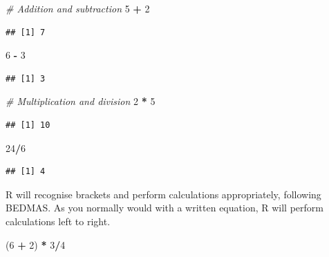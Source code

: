 \documentclass[
]{book}
\newenvironment{Shaded}{\begin{snugshade}}{\end{snugshade}}
\newcommand{\CommentTok}[1]{\textcolor[rgb]{0.56,0.35,0.01}{\textit{#1}}}
\newcommand{\DecValTok}[1]{\textcolor[rgb]{0.00,0.00,0.81}{#1}}
\newcommand{\NormalTok}[1]{#1}
\newcommand{\SpecialCharTok}[1]{\textcolor[rgb]{0.81,0.36,0.00}{\textbf{#1}}}
\begin{document}
\begin{Shaded}
\begin{Highlighting}[]
\CommentTok{\# Addition and subtraction}
\DecValTok{5} \SpecialCharTok{+} \DecValTok{2}
\end{Highlighting}
\end{Shaded}

\begin{verbatim}
## [1] 7
\end{verbatim}

\begin{Shaded}
\begin{Highlighting}[]
\DecValTok{6} \SpecialCharTok{{-}} \DecValTok{3}
\end{Highlighting}
\end{Shaded}

\begin{verbatim}
## [1] 3
\end{verbatim}

\begin{Shaded}
\begin{Highlighting}[]
\CommentTok{\# Multiplication and division}
\DecValTok{2} \SpecialCharTok{*} \DecValTok{5}
\end{Highlighting}
\end{Shaded}

\begin{verbatim}
## [1] 10
\end{verbatim}

\begin{Shaded}
\begin{Highlighting}[]
\DecValTok{24}\SpecialCharTok{/}\DecValTok{6}
\end{Highlighting}
\end{Shaded}

\begin{verbatim}
## [1] 4
\end{verbatim}

R will recognise brackets and perform calculations appropriately, following BEDMAS. As you normally would with a written equation, R will perform calculations left to right.

\begin{Shaded}
\begin{Highlighting}[]
\NormalTok{(}\DecValTok{6} \SpecialCharTok{+} \DecValTok{2}\NormalTok{) }\SpecialCharTok{*} \DecValTok{3}\SpecialCharTok{/}\DecValTok{4}
\end{Highlighting}
\end{Shaded}
\end{document}
